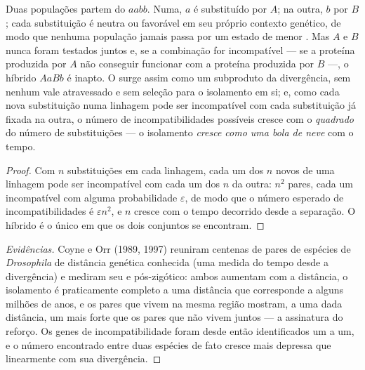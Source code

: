 \begin{theorem}\label{thm:b2:speciation:dm}
Duas populações partem do  $aabb$. Numa, $a$ é substituído por
$A$; na outra, $b$ por $B$; cada substituição é neutra ou favorável em
seu próprio contexto genético, de modo que nenhuma população jamais
passa por um estado de menor . Mas $A$ e $B$ nunca foram testados
juntos e, se a combinação for incompatível --- se a proteína produzida
por $A$ não conseguir funcionar com a proteína produzida por $B$ ---, o
híbrido $AaBb$ é inapto. O  surge assim como um
subproduto da divergência, sem nenhum vale atravessado e sem seleção
para o isolamento em si; e, como cada nova substituição numa linhagem
pode ser incompatível com cada substituição já fixada na outra, o
número de incompatibilidades possíveis cresce com o
\emph{quadrado} do número de substituições --- o isolamento
\emph{cresce como uma bola de neve} com o tempo.
\end{theorem}
\begin{proof}
Com $n$ substituições em cada linhagem, cada um dos $n$ novos  de
uma linhagem pode ser incompatível com cada um dos $n$ da outra:
$n^{2}$ pares, cada um incompatível com alguma probabilidade
$\varepsilon$, de modo que o número esperado de incompatibilidades é
$\varepsilon n^{2}$, e $n$ cresce com o tempo decorrido desde a
separação. O híbrido é o único  em que os dois conjuntos se
encontram.
\end{proof}
\begin{proof}[Evidências]
Coyne e Orr (1989, 1997) reuniram centenas de pares de espécies de
\emph{Drosophila} de distância genética conhecida (uma medida do tempo
desde a divergência) e mediram seu  e
pós-zigótico: ambos aumentam com a distância, o isolamento é praticamente
completo a uma distância que corresponde a alguns milhões de anos, e os
pares que vivem na mesma região mostram, a uma dada distância, um
 mais forte que os pares que não vivem juntos ---
a assinatura do reforço. Os genes de incompatibilidade foram desde então
identificados um a um, e o número encontrado entre duas espécies de fato
cresce mais depressa que linearmente com sua divergência.
\end{proof}

